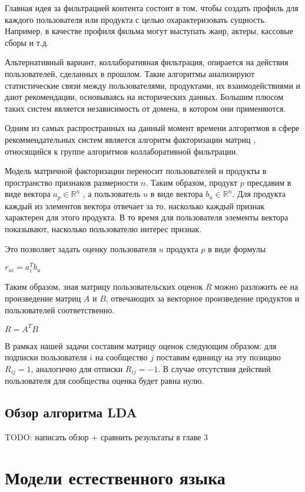 \documentclass[times,specification,annotation]{itmo-student-thesis}
\begin{document}
Главная идея за фильтрацией контента состоит в том, чтобы создать профиль для каждого пользователя или продукта с целью охарактеризовать сущность. Например, в качестве профиля фильма могут выступать жанр, актеры, кассовые сборы и т.д.

Альтернативный вариант, коллаборативная фильтрация, опирается на действия пользователей, сделанных в прошлом. Такие алгоритмы анализируют статистические связи между пользователями, продуктами, их взаимодействиями и дают рекомендации, основываясь на исторических данных.  Большим плюсом таких систем является независимость от домена, в котором они применяются.

Одним из самых распространных на данный момент времени алгоритмов в сфере рекоммендательных систем является алгоритм факторизации матриц \cite{koren2009}, относящийся к группе алгоритмов коллаборативной фильтрации.

Модель матричной факторизации переносит пользователей и продукты в пространство признаков размерности $n$. Таким образом, продукт $p$ пресдавим в виде вектора $a_{p} \in \mathbb{R}^n$ , а пользователь $u$ в виде вектора $b_{u} \in \mathbb{R}^n$. Для продукта каждый из элементов вектора отвечает за то, насколько каждый признак характерен для  этого продукта. В то время для пользователя элементы вектора показывают, насколько пользователю интерес признак.

Это позволяет задать оценку пользователя $u$ продукта $p$ в виде формулы

$r_{ui} = a_{i}^{T}b_{u}$

Таким образом, зная матрицу пользовательских оценок $R$ можно разложить ее на произведение матриц $A$ и $B$, отвечающих за векторное произведение продуктов и пользователей соответственно.

$R = A^TB$

В рамках нашей задачи составим матрицу оценок следующим образом: для подписки пользователя $i$ на сообщество $j$ поставим единицу на эту позицию $R_{ij} = 1$, аналогично для отписки $R_{ij} = - 1$. В случае отсутствия действий пользователя для сообщества оценка будет равна нулю.


\subsection{Обзор алгоритма LDA}\label{sec:lda}

TODO: написать обзор + сравнить результаты в главе 3

\section{Модели естественного языка}\label{sec:nlp-intro}
\end{document}
